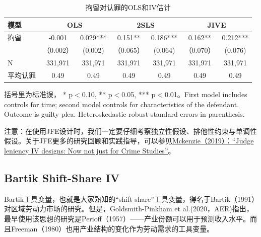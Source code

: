 \documentclass[cn,12pt,math=newtx,citestyle=gb7714-2015,bibstyle=gb7714-2015]{elegantbook}
\begin{document}
	
		\begin{table}[htbp]\centering
		\scriptsize
		\caption{拘留对认罪的OLS和IV估计}
		\label{2sls_3}
		\begin{center}
			\begin{threeparttable}
				\begin{tabular}{lcccccc}
					\toprule
					\multicolumn{1}{l}{模型}&
					\multicolumn{2}{c}{\textbf{OLS}} &\multicolumn{2}{c}{\textbf{2SLS}}&\multicolumn{2}{c}{\textbf{JIVE}}\\
					\midrule
					拘留                &       -0.001&       0.029***&0.151**&0.186***&0.162**&0.212*** \\
					&   （0.002）    &     (0.002)  &（0.065）&(0.064)&（0.070）&(0.076) \\
					N& 331,971&331,971&	331,971	&331,971&	331,971	&331,971   \\
					平均认罪&0.49&	0.49	&0.49&	0.49&	0.49&	0.49
					\\
					
					\bottomrule
				\end{tabular}
				\begin{tablenotes}
					\tiny
					\item 括号里为标准误， * p$<$0.10, ** p$<$0.05, *** p$<$0.01。First model includes controls for time; second model controls for characteristics of the defendant. Outcome is guilty plea. Heteroskedastic robust standard errors in parenthesis. 
				\end{tablenotes}
			\end{threeparttable}
		\end{center}
	\end{table}
	
	注意：在使用JFE设计时，我们一定要仔细考察独立性假设、排他性约束与单调性假设。关于JFE更多的研究回顾和实践指导，可以参见\href{https://blogs.worldbank.org/impactevaluations/judge-leniency-iv-designs-now-not-just-crime-studies}{Mckenzie（2019）：“Judge leniency IV designs: Now not just for Crime Studies”}。
	
	
	
	\subsection{Bartik Shift-Share IV}
	
	Bartik工具变量，也就是大家熟知的“shift-share”工具变量，得名于Bartik（1991）对区域劳动力市场的研究。但是，Goldsmith-Pinkham et al.(2020，AER)指出，最早使用该思想的研究是Perioff（1957）——产业份额可以用于预测收入水平。而且Freeman（1980）也用产业结构的变化作为劳动需求的工具变量。
	
\end{document}

